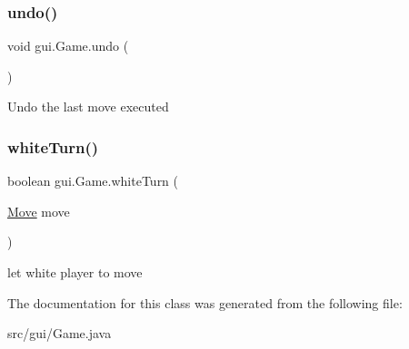 \subsubsection{\texorpdfstring{undo()}{undo()}}
{\footnotesize\ttfamily void gui.\+Game.\+undo (\begin{DoxyParamCaption}{ }\end{DoxyParamCaption})}

Undo the last move executed \mbox{\label{classgui_1_1_game_a451d11ef3789be8a74aae464c1fbfef3}} 
\subsubsection{\texorpdfstring{white\+Turn()}{whiteTurn()}}
{\footnotesize\ttfamily boolean gui.\+Game.\+white\+Turn (\begin{DoxyParamCaption}\item[{\mbox{\hyperlink{classpieces_1_1_move}{Move}}}]{move }\end{DoxyParamCaption})}

let white player to move 

The documentation for this class was generated from the following file\+:\begin{DoxyCompactItemize}
\item 
src/gui/Game.\+java\end{DoxyCompactItemize}
